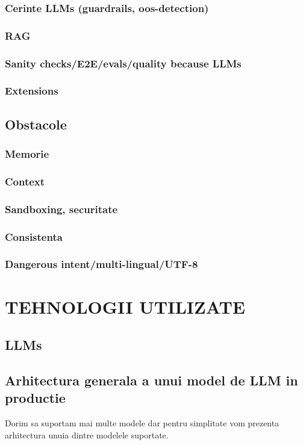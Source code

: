 \documentclass[12pt, a4paper, oneside, romanian, draft]{teza-upb}
\begin{document}
    \subsection{Cerinte LLMs (guardrails, oos-detection)}
    \subsection{RAG}
    \subsection{Sanity checks/E2E/evals/quality because LLMs}
    \subsection{Extensions}
    
  \section{Obstacole}
    \subsection{Memorie}
    \subsection{Context}
    \subsection{Sandboxing, securitate}
    \subsection{Consistenta}
    \subsection{Dangerous intent/multi-lingual/UTF-8}

\chapter{TEHNOLOGII UTILIZATE}


  \section{LLMs}


  \section{Arhitectura generala a unui model de LLM in productie}
  Dorim sa suportam mai multe modele dar pentru simplitate vom prezenta arhitectura unuia dintre modelele suportate.
\end{document}
